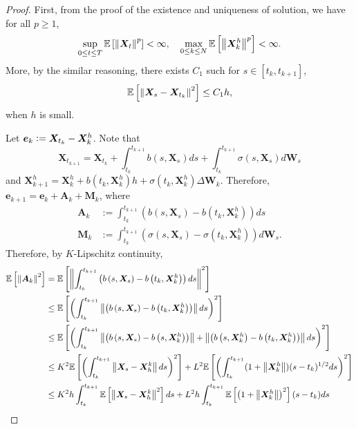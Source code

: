 \begin{proof}
    First, from the proof of the existence and uniqueness of solution, we have for all $p \geq 1$,
    \begin{equation*}
        \sup_{0 \leq t \leq T}\mathbb{E}\left[\left\lVert\bm{X}_t\right\lVert^p\right] < \infty,\quad \max_{0\leq k \leq N} \mathbb{E}\left[\left\lVert\bm{X}^h_{k}\right\lVert^p\right] < \infty.
    \end{equation*}
    More, by the similar reasoning, there exists $C_1$ such for $s \in [t_k,t_{k+1}]$,
    \begin{equation*}
        \mathbb{E}\left[\left\lVert\bm{X}_s - \bm{X}_{t_k}\right\lVert^2\right] \leq C_1h,
    \end{equation*}
    when $h$ is small.

    Let $\bm{e}_k \vcentcolon= \bm{X}_{t_k} - \bm{X}^h_{k}$. Note that
    \begin{equation*}
        \bm{X}_{t_{k+1}}=\bm{X}_{t_k}+\int_{t_k}^{t_{k+1}} b\left(s,\bm{X}_s\right) d s+\int_{t_k}^{t_{k+1}} \sigma\left(s,\bm{X}_s\right) d \bm{W}_s
    \end{equation*}
    and $\bm{X}^h_{k+1} = \bm{X}^h_k + b(t_k,\bm{X}^h_k)h + \sigma(t_k,\bm{X}^h_k)\Delta \bm{W}_k$. Therefore, $\bm{e}_{k+1} = \bm{e}_k + \bm{A}_k + \bm{M}_k$, where
    \begin{align*}
        \bm{A}_k & :=\int_{t_k}^{t_{k+1}}\left(b\left(s,\bm{X}_s\right)-b\left(t_k,\bm{X}_k^h\right)\right) d s \\
        \bm{M}_k & :=\int_{t_k}^{t_{k+1}}\left(\sigma\left(s,\bm{X}_s\right)-\sigma\left(t_k,\bm{X}_k^h\right)\right) d \bm{W}_s.
    \end{align*}
    Therefore, by $K$-Lipschitz continuity,
    \begin{align*}
        \E\bj{\norm{\bm{A}_k}^2} &= \E\bj{\norm{\int_{t_k}^{t_{k+1}}\left(b\left(s,\bm{X}_s\right)-b\left(t_k,\bm{X}_k^h\right)\right) d s }^2} \\
        &\leq \E\bj{\bc{\int_{t_k}^{t_{k+1}}\norm{\left(b\left(s,\bm{X}_s\right)-b\left(t_k,\bm{X}_k^h\right)\right)} d s}^2}\\
        &\leq \E\bj{\bc{\int_{t_k}^{t_{k+1}}\norm{\left(b\left(s,\bm{X}_s\right)-b\left(s,\bm{X}_k^h\right)\right)} +\norm{\left(b\left(s,\bm{X}_k^h\right)-b\left(t_k,\bm{X}_k^h\right)\right)} d s}^2}\\\
        &\leq K^2\E\bj{\bc{\int_{t_k}^{t_{k+1}} \norm{\bm{X}_s - \bm{X}_h^k} ds}^2} + L^2\E\bj{\bc{\int_{t_k}^{t_{k+1}} (1+\norm{\bm{X}^h_k})(s - t_k)^{1/2} ds}^2}\\
        &\leq K^2h\int_{t_k}^{t_{k+1}} \E\bj{\norm{\bm{X}_s - \bm{X}_h^k}^2} ds + L^2h \int_{t_k}^{t_{k+1}} \E\bj{\bc{1+\norm{\bm{X}^h_k}}^2}(s - t_k) ds\\

\end{align*}
\end{proof}

